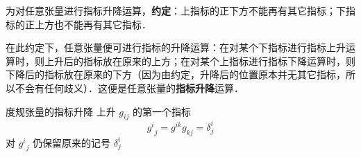为对任意张量进行指标升降运算，\textbf{约定}：上指标的正下方不能再有其它指标；下指标的正上方也不能再有其它指标．

在此约定下，任意张量便可进行指标的升降运算：在对某个下指标进行指标上升运算时，则上升后的指标放在原来的上方；在对某个上指标进行指标下降运算时，则下降后的指标放在原来的下方（因为由约定，升降后的位置原本并无其它指标，所以不会有任何歧义）．这便是任意张量的\textbf{指标升降}运算．

\begin{example}{度规张量的指标升降}
上升 $g_{ij}$ 的第一个指标
\begin{equation}
{g^{i}}_{j}=g^{ik} g_{kj}=\delta^i_j
\end{equation}
对 ${g^i}_j$ 仍保留原来的记号 $\delta^i_j$
\end{example}